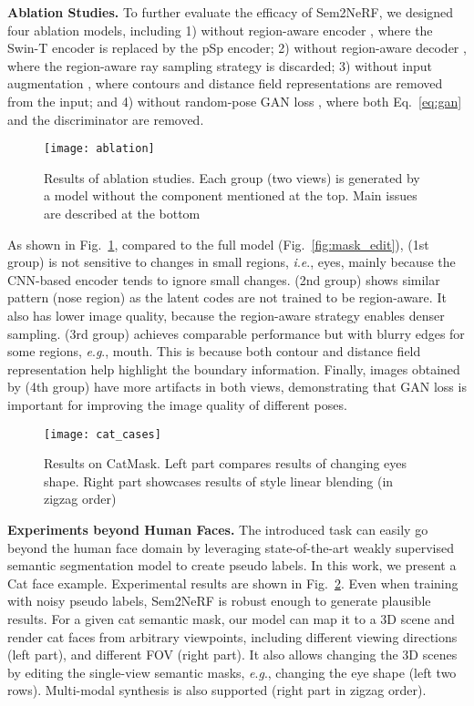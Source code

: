 \documentclass[runningheads]{llncs}
\newcommand{\ie}{\textit{i}.\textit{e}.}
\newcommand{\eg}{\textit{e}.\textit{g}.}
\begin{document}
\noindent\textbf{Ablation Studies.}  
To further evaluate the efficacy of Sem2NeRF, we designed four ablation models, including 1) without region-aware encoder , where the Swin-T encoder is replaced by the pSp encoder; 2) without region-aware decoder , where the region-aware ray sampling strategy is discarded; 3) without input augmentation , where contours and distance field representations are removed from the input; and 4) without random-pose GAN loss , where both Eq.~\eqref{eq:gan} and the discriminator are removed.


\begin{figure}[t!]
    \centering
    \texttt{[image: ablation]}
    \caption{Results of ablation studies. Each group (two views) is generated by a model without the component mentioned at the top. Main issues are described at the bottom}
    \label{fig:ablation}
\end{figure}

As shown in Fig.~\ref{fig:ablation}, compared to the full model (Fig.~\ref{fig:mask_edit}),  (1st group) is not sensitive to changes in small regions, \ie, eyes, mainly because the CNN-based encoder tends to ignore small changes.  (2nd group) shows similar pattern (nose region) as the latent codes are not trained to be region-aware. It also has lower image quality, because the region-aware strategy enables denser sampling.  (3rd group) achieves comparable performance but with blurry edges for some regions, \eg, mouth. This is because both contour and distance field representation help highlight the boundary information. Finally, images obtained by  (4th group) have more artifacts in both views, demonstrating that GAN loss is important for improving the image quality of different poses.  


\begin{figure}[t!]
    \centering
    \texttt{[image: cat\_cases]}
    \caption{Results on CatMask. Left part compares results of changing eyes shape. Right part showcases results of style linear blending (in zigzag order)}
    \label{fig:cat_cases}
\end{figure}



\noindent\textbf{Experiments beyond Human Faces.} The introduced task can easily go beyond the human face domain by leveraging state-of-the-art weakly supervised semantic segmentation model to create pseudo labels. In this work, we present a Cat face example.
Experimental results are shown in Fig.~\ref{fig:cat_cases}. 
Even when training with noisy pseudo labels, Sem2NeRF is robust enough to generate plausible results. For a given cat semantic mask, our model can map it to a 3D scene and render cat faces from arbitrary viewpoints, including different viewing directions (left part), and different FOV (right part). It also allows changing the 3D scenes by editing the single-view semantic masks, \eg, changing the eye shape (left two rows). Multi-modal synthesis is also supported (right part in zigzag order). 
\end{document}

